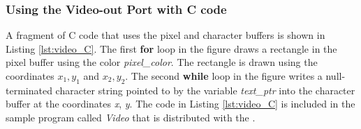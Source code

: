 \subsubsection{Using the Video-out Port with C code}

A fragment of C code that uses the pixel and character buffers is shown in 
Listing \ref{lst:video_C}.  The first {\bf for} loop in the figure draws a rectangle in 
the pixel buffer using the color {\it pixel\_color}. The rectangle is drawn using the
coordinates $x_1, y_1$ and $x_2, y_2$.  The second {\bf while} loop in the 
figure writes a null-terminated character
string pointed to by the variable {\it text\_ptr} into the character buffer at the
coordinates {\it x}, {\it y}.  The code in Listing \ref{lst:video_C}
is included in the sample program called {\it Video} that is 
distributed with the \productNameMed{}. 